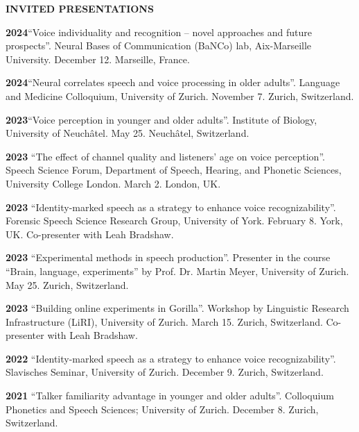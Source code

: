\documentclass[11pt]{article}
\newcommand{\hangpara}{
 \setlength{\parindent}{0in} %
 \hangindent=0.42in %
}
\begin{document}
\vskip 20pt
\begin{flushleft}
{\bf INVITED PRESENTATIONS}
\end{flushleft}

\hangpara
{\bf 2024}\hspace{1ex}“Voice individuality and recognition – novel approaches and future prospects”. Neural Bases of Communication (BaNCo) lab, Aix-Marseille University. December 12. Marseille, France. 

\vskip 6pt
\hangpara
{\bf 2024}\hspace{1ex}“Neural correlates speech and voice processing in older adults”. Language and Medicine Colloquium, University of Zurich. November 7. Zurich, Switzerland. 

\vskip 6pt
\hangpara
{\bf 2023}\hspace{1ex}“Voice perception in younger and older adults”. Institute of Biology, University of Neuchâtel. May 25. Neuchâtel, Switzerland. 

\vskip 6pt
\hangpara
{\bf 2023}\hspace{1ex} “The effect of channel quality and listeners’ age on voice perception”. Speech Science Forum, Department of Speech, Hearing, and Phonetic Sciences, University College London. March 2. London, UK.

\vskip 6pt
\hangpara
{\bf 2023}\hspace{1ex} “Identity-marked speech as a strategy to enhance voice recognizability”. Forensic Speech Science Research Group, University of York. February 8. York, UK. Co-presenter with Leah Bradshaw.

\vskip 6pt
\hangpara
{\bf 2023}\hspace{1ex} “Experimental methods in speech production”. Presenter in the course “Brain, language, experiments” by Prof. Dr. Martin Meyer, University of Zurich. May 25. Zurich, Switzerland. 

\vskip 6pt
\hangpara
{\bf 2023}\hspace{1ex} “Building online experiments in Gorilla”. Workshop by Linguistic Research Infrastructure (LiRI), University of Zurich. March 15. Zurich, Switzerland. Co-presenter with Leah Bradshaw.

\vskip 6pt
\hangpara
{\bf 2022}\hspace{1ex} “Identity-marked speech as a strategy to enhance voice recognizability”. Slavisches Seminar, University of Zurich. December 9. Zurich, Switzerland.

\vskip 6pt
\hangpara
{\bf 2021}\hspace{1ex} “Talker familiarity advantage in younger and older adults”. Colloquium Phonetics and Speech Sciences; University of Zurich. December 8. Zurich, Switzerland.
\end{document}
